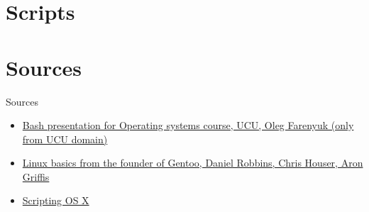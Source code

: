 \documentclass[usenames,dvipsnames,10pt,aspectratio=169]{beamer}
\begin{document}
\section{Scripts}

\section{Sources}
\begin{frame}{Sources}
\begin{itemize}
    \item \href{https://cms.ucu.edu.ua/pluginfile.php/181565/mod_resource/content/3/os_p01_bash.pdf}{Bash presentation for Operating systems course, UCU, Oleg Farenyuk (only from UCU domain)}
    \item \href{https://www.funtoo.org/Linux_Fundamentals,_Part_1}{Linux basics from the founder of Gentoo, Daniel Robbins, Chris Houser, Aron Griffis}
    \item \href {https://scriptingosx.com/}{Scripting OS X}
\end{itemize}    
\end{frame}
\end{document}
